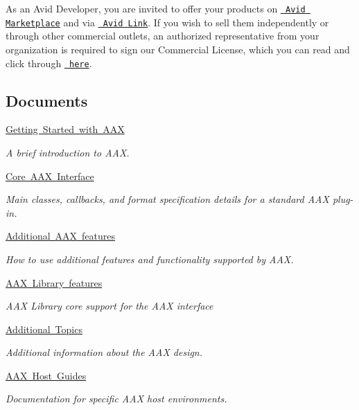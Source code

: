 As an Avid Developer, you are invited to offer your products on \href{https://shop.avid.com/}{\texttt{ Avid Marketplace}} and via \href{https://www.avid.com/products/avid-link}{\texttt{ Avid Link}}. If you wish to sell them independently or through other commercial outlets, an authorized representative from your organization is required to sign our Commercial License, which you can read and click through \href{http://www.avid.com/alliance-partner-program/how-to-apply}{\texttt{ here}}. \subsection*{Documents}
\begin{DoxyCompactItemize}
\item 
\mbox{\hyperlink{a00794}{Getting Started with A\+AX}}
\begin{DoxyCompactList}\small\item\em A brief introduction to A\+AX. \end{DoxyCompactList}\item 
\mbox{\hyperlink{a00795}{Core A\+A\+X Interface}}
\begin{DoxyCompactList}\small\item\em Main classes, callbacks, and format specification details for a standard A\+AX plug-\/in. \end{DoxyCompactList}\item 
\mbox{\hyperlink{a00802}{Additional A\+A\+X features}}
\begin{DoxyCompactList}\small\item\em How to use additional features and functionality supported by A\+AX. \end{DoxyCompactList}\item 
\mbox{\hyperlink{a00813}{A\+A\+X Library features}}
\begin{DoxyCompactList}\small\item\em A\+AX Library core support for the A\+AX interface \end{DoxyCompactList}\item 
\mbox{\hyperlink{a00818}{Additional Topics}}
\begin{DoxyCompactList}\small\item\em Additional information about the A\+AX design. \end{DoxyCompactList}\item 
\mbox{\hyperlink{a00829}{A\+A\+X Host Guides}}
\begin{DoxyCompactList}\small\item\em Documentation for specific A\+AX host environments. \end{DoxyCompactList}\item 

\end{DoxyCompactItemize}
